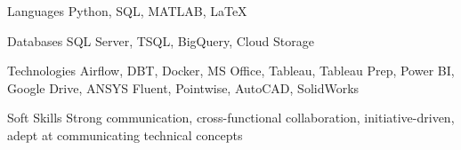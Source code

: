 
\begin{cvskills}
  \cvskill
    {Languages} %
    {Python, SQL, MATLAB, LaTeX} %
  
  \cvskill
    {Databases} %
    {SQL Server, TSQL, BigQuery, Cloud Storage} %
    
  \cvskill
    {Technologies} %
    {Airflow, DBT, Docker, MS Office, Tableau, Tableau Prep, Power BI, Google Drive, ANSYS Fluent, Pointwise, AutoCAD, SolidWorks} %
    
  \cvskill
    {Soft Skills} %
    {Strong communication, cross-functional collaboration, initiative-driven, adept at communicating technical concepts}

\end{cvskills}
